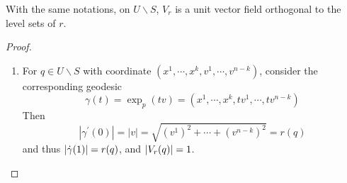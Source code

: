 \begin{enumerate}[label=\arabic{*}.]
 	\begin{thm}
 	    With the same notations, on $U \backslash S$, $V_r$ is a unit vector field orthogonal to the level sets of $r$.
 	\end{thm}
 	\begin{proof}
 		\begin{enumerate}[label=(\roman*)]
 			\item For $q \in U \backslash S$ with coordinate $(x^1,\cdots,x^k,v^1,\cdots,v^{n-k})$, consider the corresponding geodesic
	 	    \begin{equation*}
	 	        \gamma(t) = \exp_p(tv) = (x^1,\cdots,x^k,tv^1,\cdots,tv^{n-k})
	 	    \end{equation*}
	 	    Then
	 	    \begin{equation*}
	 	        \left|\gamma^{\prime}(0)\right|=|v|=\sqrt{\left(v^1\right)^2+\cdots+\left(v^{n-k}\right)^2}=r(q)
	 	    \end{equation*}
	 	    and thus $\left\lvert\dot{\gamma}(1)\right\lvert = r(q)$, and $\left\lvert V_r(q)\right\lvert = 1$. 


\end{enumerate}
\end{proof}
\end{enumerate}
